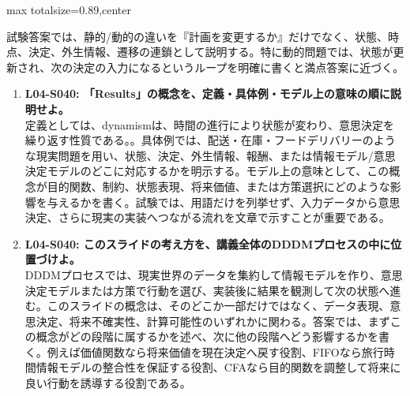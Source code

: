 \begin{minipage}[t]{0.58\textwidth}
\begin{adjustbox}{max totalsize={\textwidth}{0.89\textheight},center}
\begin{minipage}{\textwidth}
試験答案では、静的/動的の違いを『計画を変更するか』だけでなく、状態、時点、決定、外生情報、遷移の連鎖として説明する。特に動的問題では、状態が更新され、次の決定の入力になるというループを明確に書くと満点答案に近づく。\par{}\begin{enumerate}\item \textbf{L04-S040: 「Results」の概念を、定義・具体例・モデル上の意味の順に説明せよ。}\\定義としては、dynamismは、時間の進行により状態が変わり、意思決定を繰り返す性質である。。具体例では、配送・在庫・フードデリバリーのような現実問題を用い、状態、決定、外生情報、報酬、または情報モデル/意思決定モデルのどこに対応するかを明示する。モデル上の意味として、この概念が目的関数、制約、状態表現、将来価値、または方策選択にどのような影響を与えるかを書く。試験では、用語だけを列挙せず、入力データから意思決定、さらに現実の実装へつながる流れを文章で示すことが重要である。\item \textbf{L04-S040: このスライドの考え方を、講義全体のDDDMプロセスの中に位置づけよ。}\\DDDMプロセスでは、現実世界のデータを集約して情報モデルを作り、意思決定モデルまたは方策で行動を選び、実装後に結果を観測して次の状態へ進む。このスライドの概念は、そのどこか一部だけではなく、データ表現、意思決定、将来不確実性、計算可能性のいずれかに関わる。答案では、まずこの概念がどの段階に属するかを述べ、次に他の段階へどう影響するかを書く。例えば価値関数なら将来価値を現在決定へ戻す役割、FIFOなら旅行時間情報モデルの整合性を保証する役割、CFAなら目的関数を調整して将来に良い行動を誘導する役割である。\end{enumerate}
\end{minipage}
\end{adjustbox}
\end{minipage}


